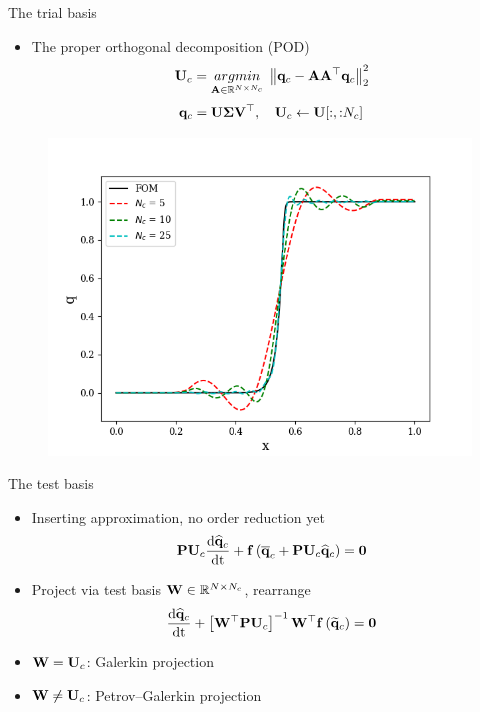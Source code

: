 \documentclass[]{beamer}
\begin{document}
\begin{frame}{The trial basis}
    \begin{itemize}
        \item The proper orthogonal decomposition (POD)\footnotemark[1]
        \begin{equation*}
            \consTrial = \argmin{\dummyMatOne \in \mathbb{R}^{\numDOF \times \numConsvModes}} \norm{\consDataMat - \dummyMatOne \dummyMatOne^\top \consDataMat}_2^2
        \end{equation*}
        \begin{equation*}
            \consDataMat = \basisMat \singVecMat \rightSingVecMat^\top, \quad \consTrial \leftarrow \basisMat[:, {:}\numConsvModes]
        \end{equation*}
    \end{itemize}
	\centering
	\vspace{-0.8em}
	\begin{figure}
		\includegraphics[width=0.5\linewidth]{theory/podProfileConverge.png}
	\end{figure}
\end{frame}

\begin{frame}{The test basis}
    \begin{itemize}
        \item Inserting approximation, no order reduction yet
        \begin{equation*}
            \consScale \consTrial \ode{\consVecCoef}{\timeVar} + \rhsFunc{\consVecCent + \consScale \consTrial \consVecCoef} = \zeroVec 
        \end{equation*}
        \item Project via test basis $\testBasis \in \mathbb{R}^{\numDOF \times \numConsvModes}$, rearrange
        \begin{equation*}
            \ode{\consVecCoef}{\timeVar} + \left[ \testBasis^\top \consScale \consTrial \right]^{-1} \testBasis^\top \rhsFunc{\consVecRom} = \zeroVec
        \end{equation*}
        \item $\testBasis = \consTrial$: Galerkin projection
        \item $\testBasis \neq \consTrial$: Petrov--Galerkin projection 
    \end{itemize}
\end{frame}
\end{document}

